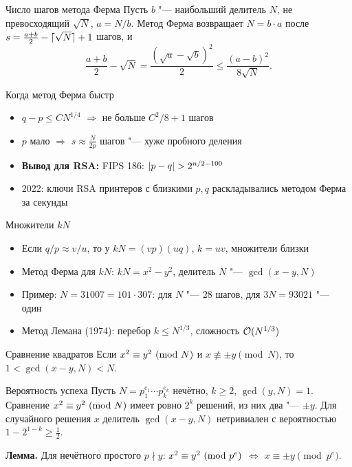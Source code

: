 \documentclass{ca-slides}
\begin{document}
\begin{theoremframe}{Число шагов метода Ферма}
  Пусть $b$ "--- наибольший делитель $N$, не превосходящий $\sqrt N$, $a = N/b$. Метод
  Ферма возвращает $N = b \cdot a$ после $s = \frac{a+b}{2} - \lceil\sqrt N\rceil + 1$ шагов, и
  \[\frac{a + b}{2} - \sqrt N = \frac{(\sqrt a - \sqrt b)^2}{2} \le \frac{(a - b)^2}{8\sqrt N}.\]
\end{theoremframe}

\begin{canvasframe}{Когда метод Ферма быстр}
  \begin{itemize}
    \item $q - p \le C N^{1/4}$ $\Rightarrow$ не больше $C^2/8 + 1$ шагов
    \item $p$ мало $\Rightarrow$ $s \approx \frac{N}{2p}$ шагов "--- хуже пробного деления
    \item \textbf{Вывод для RSA:} FIPS 186: $\lvert p - q\rvert > 2^{n/2 - 100}$
    \item 2022: ключи RSA принтеров с близкими $p, q$ раскладывались методом Ферма за секунды
  \end{itemize}
  \vfill
\end{canvasframe}

\begin{canvasframe}{Множители $kN$}
  \begin{itemize}
    \item Если $q/p \approx v/u$, то у $kN = (vp)(uq)$, $k = uv$, множители близки
    \item Метод Ферма для $kN$: $kN = x^2 - y^2$, делитель $N$ "--- $\gcd(x - y, N)$
    \item Пример: $N = 31007 = 101 \cdot 307$: для $N$ "--- $28$ шагов, для $3N = 93021$ "--- один
    \item Метод Лемана (1974): перебор $k \le N^{1/3}$, сложность $\mathcal{O}(N^{1/3})$
  \end{itemize}
  \vfill
\end{canvasframe}

\begin{theoremframe}[lemma]{Сравнение квадратов}
  Если $x^2 \equiv y^2\ (\mathrm{mod}\ N)$ и $x \not\equiv \pm y \pmod N$, то
  $1 < \gcd(x - y, N) < N$.
\end{theoremframe}

\begin{theoremframe}{Вероятность успеха}
  Пусть $N = p_1^{e_1} \cdots p_k^{e_k}$ нечётно, $k \ge 2$, $\gcd(y, N) = 1$. Сравнение
  $x^2 \equiv y^2\ (\mathrm{mod}\ N)$ имеет ровно $2^k$ решений, из них два "--- $\pm y$. Для случайного
  решения $x$ делитель $\gcd(x - y, N)$ нетривиален с вероятностью $1 - 2^{1-k} \ge \frac12$.
  \par\smallskip\textbf{Лемма.} Для нечётного простого $p \nmid y$:
  $x^2 \equiv y^2\ (\mathrm{mod}\ p^e)$ $\iff$ $x \equiv \pm y \pmod{p^e}$.
\end{theoremframe}
\end{document}

